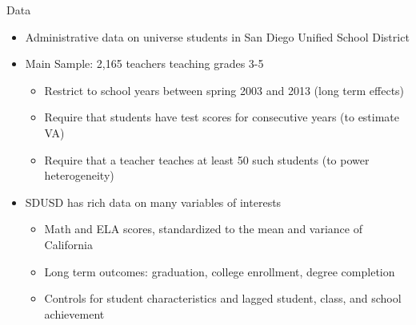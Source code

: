 \documentclass[t,aspectratio=169]{beamer}
\begin{document}
\begin{frame}{Data}
\begin{itemize}
        \vspace{.75em}
        \setlength\itemsep{.75em}
    \item Administrative data on universe students in San Diego Unified School District

    \item Main Sample: 2,165 teachers teaching grades 3-5
        
    \begin{itemize}
            \vspace{.5em}
        \setlength\itemsep{.5em}
        \item Restrict to school years between spring 2003 and 2013 (long term effects)
        \item Require that students have test scores for consecutive years (to estimate VA)
        \item Require that a teacher teaches at least 50 such students (to power heterogeneity)
    \end{itemize}    
        
    \item SDUSD has rich data on many variables of interests
        \begin{itemize}
                \vspace{.5em}
        \setlength\itemsep{.5em}
        \item Math and ELA scores, standardized to the mean and variance of California
        \item Long term outcomes: graduation, college enrollment, degree completion
        \item Controls for student characteristics and lagged student, class, and school achievement
    \end{itemize}  
\end{itemize}
\end{frame}

\end{document}
